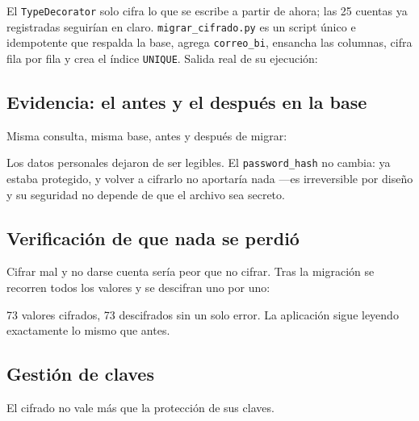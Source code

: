 \documentclass[11pt,letterpaper]{article}
\begin{document}
El \texttt{TypeDecorator} solo cifra lo que se escribe a partir de ahora; las
25 cuentas ya registradas seguirían en claro. \texttt{migrar\_cifrado.py} es un
script único e idempotente que respalda la base, agrega \texttt{correo\_bi},
ensancha las columnas, cifra fila por fila y crea el índice \texttt{UNIQUE}.
Salida real de su ejecución:



\subsection{Evidencia: el antes y el después en la base}

Misma consulta, misma base, antes y después de migrar:



\begin{bien}
Los datos personales dejaron de ser legibles. El \texttt{password\_hash} no
cambia: ya estaba protegido, y volver a cifrarlo no aportaría nada —es
irreversible por diseño y su seguridad no depende de que el archivo sea
secreto.
\end{bien}

\subsection{Verificación de que nada se perdió}

Cifrar mal y no darse cuenta sería peor que no cifrar. Tras la migración se
recorren todos los valores y se descifran uno por uno:



73 valores cifrados, 73 descifrados sin un solo error. La aplicación sigue
leyendo exactamente lo mismo que antes.

\subsection{Gestión de claves}

El cifrado no vale más que la protección de sus claves.
\end{document}
